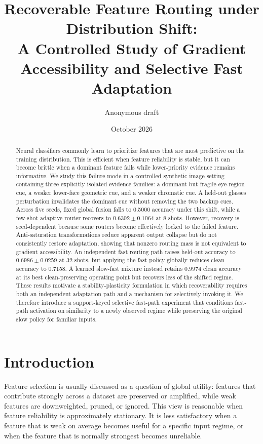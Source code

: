 \documentclass[10pt]{article}
\title{Recoverable Feature Routing under Distribution Shift:\\
A Controlled Study of Gradient Accessibility and Selective Fast Adaptation}
\author{Anonymous draft}
\date{October 2026}
\begin{document}
\maketitle

\begin{abstract}
Neural classifiers commonly learn to prioritize features that are most predictive on the training distribution. This is efficient when feature reliability is stable, but it can become brittle when a dominant feature fails while lower-priority evidence remains informative. We study this failure mode in a controlled synthetic image setting containing three explicitly isolated evidence families: a dominant but fragile eye-region cue, a weaker lower-face geometric cue, and a weaker chromatic cue. A held-out glasses perturbation invalidates the dominant cue without removing the two backup cues. Across five seeds, fixed global fusion falls to 0.5000 accuracy under this shift, while a few-shot adaptive router recovers to $0.6302 \pm 0.1064$ at 8 shots. However, recovery is seed-dependent because some routers become effectively locked to the failed feature. Anti-saturation transformations reduce apparent output collapse but do not consistently restore adaptation, showing that nonzero routing mass is not equivalent to gradient accessibility. An independent fast routing path raises held-out accuracy to $0.6986 \pm 0.0259$ at 32 shots, but applying the fast policy globally reduces clean accuracy to 0.7158. A learned slow-fast mixture instead retains 0.9974 clean accuracy at its best clean-preserving operating point but recovers less of the shifted regime. These results motivate a stability-plasticity formulation in which recoverability requires both an independent adaptation path and a mechanism for selectively invoking it. We therefore introduce a support-keyed selective fast-path experiment that conditions fast-path activation on similarity to a newly observed regime while preserving the original slow policy for familiar inputs.
\end{abstract}

\section{Introduction}

Feature selection is usually discussed as a question of global utility: features that contribute strongly across a dataset are preserved or amplified, while weak features are downweighted, pruned, or ignored. This view is reasonable when feature reliability is approximately stationary. It is less satisfactory when a feature that is weak on average becomes useful for a specific input regime, or when the feature that is normally strongest becomes unreliable.
\end{document}
